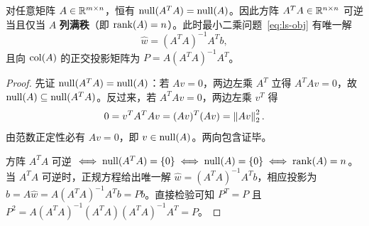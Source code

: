 \begin{thmBox}
\begin{theorem}[正规方程的可逆性判据]\label{thm:ata-inv}
对任意矩阵 $A \in \mathbb{R}^{m \times n}$，恒有 $\operatorname{null}(A^T A) = \operatorname{null}(A)$。因此方阵 $A^T A \in \mathbb{R}^{n \times n}$ 可逆当且仅当 $A$ \textbf{列满秩}（即 $\operatorname{rank}(A) = n$）。此时最小二乘问题~\eqref{eq:ls-obj} 有唯一解
\[
\hat{w} = (A^T A)^{-1} A^T b,
\]
且向 $\operatorname{col}(A)$ 的正交投影矩阵为 $P = A (A^T A)^{-1} A^T$。
\end{theorem}
\end{thmBox}

\begin{proof}
先证 $\operatorname{null}(A^T A) = \operatorname{null}(A)$：若 $Av = 0$，两边左乘 $A^T$ 立得 $A^T A v = 0$，故 $\operatorname{null}(A) \subseteq \operatorname{null}(A^T A)$。反过来，若 $A^T A v = 0$，两边左乘 $v^T$ 得
\[
0 = v^T A^T A v = (Av)^T (Av) = \left\|Av\right\|_2^2.
\]
由范数正定性必有 $Av = 0$，即 $v \in \operatorname{null}(A)$。两向包含证毕。

方阵 $A^T A$ 可逆 $\iff \operatorname{null}(A^T A) = \{0\} \iff \operatorname{null}(A) = \{0\} \iff \operatorname{rank}(A) = n$。当 $A^T A$ 可逆时，正规方程给出唯一解 $\hat{w} = (A^T A)^{-1} A^T b$，相应投影为 $\hat{b} = A\hat{w} = A(A^T A)^{-1} A^T b = Pb$。直接检验可知 $P^T = P$ 且 $P^2 = A(A^T A)^{-1}(A^T A)(A^T A)^{-1} A^T = P$。
\end{proof}

